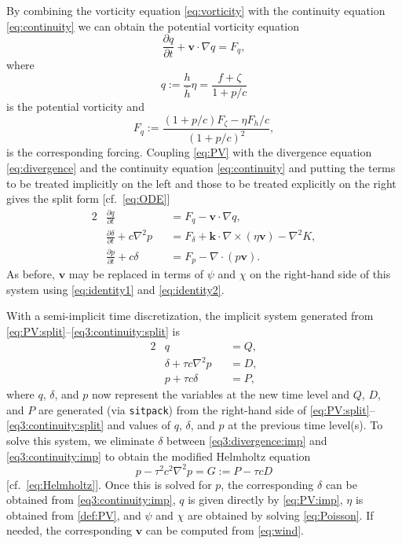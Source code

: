 \documentclass[12pt]{article}
\newcommand{\vecv}{\mathbf{v}}
\newcommand{\veck}{\mathbf{k}}
\newcommand{\Fmass}{F_h}
\newcommand{\Fphi}{F_\p}
\newcommand{\Fzeta}{F_{\zeta}}
\newcommand{\Fdelta}{F_{\delta}}
\newcommand{\href}{\bar{h}}
\newcommand{\p}{{p}}   %
\renewcommand{\P}{{P}} %
\newcommand{\PV}{q}    %
\newcommand{\FPV}{F_q} %
\newcommand{\cross}{\times}
\newcommand{\del}{\nabla}
\begin{document}
By combining the vorticity equation \eqref{eq:vorticity} with the continuity
equation \eqref{eq:continuity} we can obtain the potential vorticity equation
\begin{equation}
   \frac{\partial \PV}{\partial t} + \vecv\cdot\del\PV = \FPV ,
\label{eq:PV}
\end{equation}
where
\begin{equation}
   \PV := \frac{h}{\href}\eta = \frac{f+\zeta}{1+\p/c}
\label{def:PV}
\end{equation}
is the potential vorticity and
\begin{equation}
   \FPV := \frac{(1+\p/c)\Fzeta - \eta\Fmass/c}{(1+p/c)^2} ,
\label{def:FPV}
\end{equation}
is the corresponding forcing.  Coupling \eqref{eq:PV} with the divergence
equation \eqref{eq:divergence} and the continuity equation
\eqref{eq:continuity} and putting the terms to be treated implicitly on the
left and those to be treated explicitly on the right gives the split form
[cf.~\eqref{eq:ODE}]
\begin{alignat}{2}
   &\frac{\partial\PV}{\partial t} &&= \FPV - \vecv\cdot\del\PV ,
\label{eq:PV:split}
\\
   &\frac{\partial \delta}{\partial t} + c\del^2 \p &&= 
      \Fdelta + \veck\cdot\del\cross(\eta\vecv) - \del^2 K ,
\label{eq3:divergence:split}
\\
   &\frac{\partial\p}{\partial t} + c\delta &&= \Fphi - \del\cdot(\p\vecv) .
\label{eq3:continuity:split}
\end{alignat}
As before, $\vecv$ may be replaced in terms of $\psi$ and $\chi$ on the
right-hand side of this system using \eqref{eq:identity1} and
\eqref{eq:identity2}.

With a semi-implicit time discretization, the implicit system generated from
\eqref{eq:PV:split}--\eqref{eq3:continuity:split} is
\begin{alignat}{2}
   &\PV &&= Q ,
\label{eq:PV:imp}
\\
   &\delta + \tau c\del^2 \p &&= D ,
\label{eq3:divergence:imp}
\\
   &\p + \tau c\delta &&= \P ,
\label{eq3:continuity:imp}
\end{alignat}
where $\PV$, $\delta$, and $\p$ now represent the variables at the new
time level and $Q$, $D$, and $\P$ are generated (via \verb+sitpack+) from
the right-hand side of
\eqref{eq:PV:split}--\eqref{eq3:continuity:split} and values of
$\PV$, $\delta$, and $\p$ at the previous time level(s).  
To solve this system, we eliminate $\delta$ between 
\eqref{eq3:divergence:imp} and \eqref{eq3:continuity:imp} to
obtain the modified Helmholtz equation
\begin{equation}
  \p - \tau^2 c^2\del^2 \p = G := \P - \tau c D
\label{eq3:Helmholtz}
\end{equation}
[cf.~\eqref{eq:Helmholtz}].
Once this is solved for $\p$, the corresponding $\delta$ can be obtained from
\eqref{eq3:continuity:imp}, $\PV$ is given directly by \eqref{eq:PV:imp},
$\eta$ is obtained from \eqref{def:PV}, and $\psi$ and $\chi$ are obtained by
solving \eqref{eq:Poisson}.  If needed, the corresponding $\vecv$ can be
computed from \eqref{eq:wind}.
\end{document}
